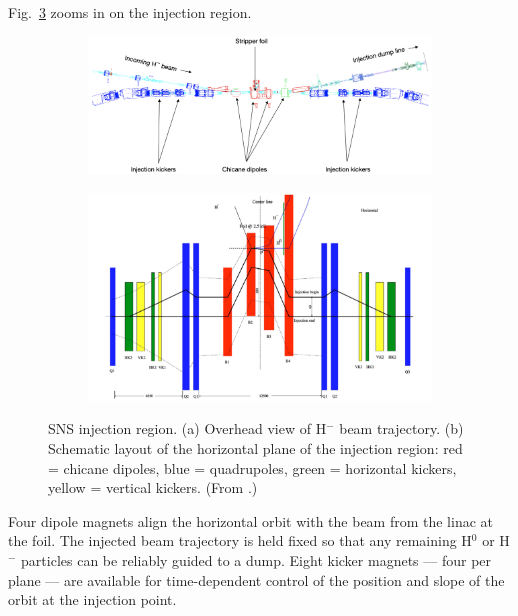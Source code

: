 Fig.~\ref{fig:SNS_injection_region} zooms in on the injection region.
%
\begin{figure}[!p]
    \centering
    \begin{subfigure}{\textwidth}
        \includegraphics[width=\textwidth]{Images/chapter1/SNS_injection_region1.png}
        \label{fig:SNS_injection_region_a}
        \caption{}
    \end{subfigure}
    \vfill
    \vspace*{1.5cm}
    \vfill
    \begin{subfigure}{\textwidth}
        \centering
        \includegraphics[width=\textwidth]{Images/chapter1/SNS_injection_region_2b.png}
        \caption{}
        \label{fig:SNS_injection_region_b}
    \end{subfigure}
    \caption{SNS injection region. (a) Overhead view of H$^-$ beam trajectory. (b) Schematic layout of the horizontal plane of the injection region: red = chicane dipoles, blue = quadrupoles, green = horizontal kickers, yellow = vertical kickers. (From \cite{Henderson2014}.)}
    \label{fig:SNS_injection_region}
\end{figure}
%
Four dipole magnets align the horizontal orbit with the beam from the linac at the foil. The injected beam trajectory is held fixed so that any remaining H$^0$ or H$^-$ particles can be reliably guided to a dump. Eight kicker magnets — four per plane — are available for time-dependent control of the position and slope of the orbit at the injection point. 


